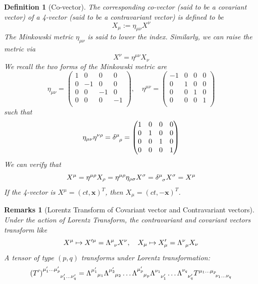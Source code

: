 \documentclass[a4paper]{article}
\newtheorem{remarks}{Remarks}[section]
\theoremstyle{new}
\newtheorem{defi}{Definition}[section]
\begin{document}
\begin{defi}[Co-vector]
The corresponding co-vector (said to be a covariant vector) of a 4-vector (said to be a contravariant vector) is defined to be
$$X_\mu:=\eta_{\mu\nu}X^\nu$$
The Minkowski metric $\eta_{\mu\nu}$ is said to lower the index. Similarly, we can raise the metric via
$$X^\nu=\eta^{\mu\nu}X_\nu$$
We recall the two forms of the Minkowski metric are
$$\eta_{\mu\nu}=\begin{pmatrix}1&0&0&0\\0&-1&0&0\\0&0&-1&0\\0&0&0&-1\\\end{pmatrix},\quad\eta^{\mu\nu}=\begin{pmatrix}-1&0&0&0\\0&1&0&0\\0&0&1&0\\0&0&0&1\\\end{pmatrix}$$
such that 
$$\eta_{\mu\nu}\eta^{\nu\rho}=\tensor*{\delta}{*_{}^{\mu}_{\rho}}=\begin{pmatrix}1&0&0&0\\0&1&0&0\\0&0&1&0\\0&0&0&1\\\end{pmatrix}$$
We can verify that
$$X^\mu=\eta^{\mu\rho}X_{\rho}=\eta^{\mu\rho}\eta_{\rho\sigma}X^\sigma=\tensor*{\delta}{*_{}^{\mu}_{\sigma}} X^\sigma=X^\mu$$
If the 4-vector is $X^\mu=(ct,\mathbf{x})^T$, then $X_\mu=(ct,-\mathbf{x})^T$.
\end{defi}
\begin{remarks}[Lorentz Transform of Covariant vector and Contravariant vectors]
Under the action of Lorentz Transform, the contravariant and covariant vectors transform like
$$X^\mu\mapsto X'^\mu=\tensor*{\Lambda}{*_{}^{\mu}_{\nu}}X^\nu,\quad X_\mu\mapsto X'_\mu=\tensor*{\Lambda}{*_{}^{\nu}_{\mu}} X_\nu$$
A tensor of type $(p,q)$ transforms under Lorentz transformation:
$$\tensor*{(T')}{*_{}^{\mu_1'\dots\mu_p'}_{\nu_1'\dots\nu_q'}}=\tensor*{\Lambda}{*_{}^{\mu_1'}_{\mu_1}}\tensor*{\Lambda}{*_{}^{\mu_2'}_{\mu_2}}\dots\tensor*{\Lambda}{*_{}^{\mu_p'}_{\mu_p}}\tensor*{\Lambda}{*_{}^{\nu_1}_{\nu_1'}}\dots\tensor*{\Lambda}{*_{}^{\nu_q}_{\nu_q'}}\tensor*{T}{*_{}^{\mu_1\dots\mu_p}_{\nu_1\dots\nu_q}}$$
\end{remarks}
\end{document}
